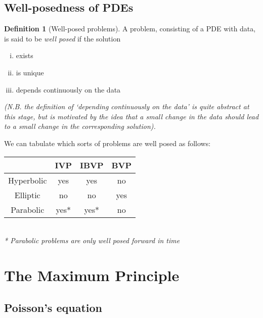 \documentclass[10pt,fleqn]{article}
\theoremstyle{definition} \newtheorem{defn}{Definition}[section]
\theoremstyle{plain}      \newtheorem{thm}[defn]{Theorem}
\theoremstyle{plain}      \newtheorem{lem}[defn]{Lemma}
\theoremstyle{definition} \newtheorem{prop}[defn]{Proposition}
\theoremstyle{definition} \newtheorem{cor}[defn]{Corollary}
\theoremstyle{definition} \newtheorem{ex}[defn]{Example}
\theoremstyle{definition} \newtheorem{rem}[defn]{Remark}
\begin{document}
\subsection{Well-posedness of PDEs}

\begin{defn}[Well-posed problems]
    A problem, consisting of a PDE with data, is said to be \emph{well posed} if the solution
    \begin{enumerate}[(i)]
        \item exists
        \item is unique
        \item depends continuously on the data
    \end{enumerate}
    \emph{(N.B. the definition of `depending continuously on the data' is quite abstract at this stage, but is motivated by the idea that a small change in the data should lead to a small change in the corresponding solution).}
\end{defn}

We can tabulate which sorts of problems are well posed as follows:\\
{\renewcommand{\arraystretch}{1.5}
\renewcommand{\tabcolsep}{0.2cm}
\begin{tabular}{c|ccc}
    & IVP & IBVP & BVP \\
    \hline
    Hyperbolic & yes & yes & no\\
    Elliptic & no & no & yes\\
    Parabolic & yes* & yes* & no
\end{tabular}}\\
\emph{* Parabolic problems are only well posed forward in time}


\section{The Maximum Principle}


\subsection{Poisson's equation}
\end{document}
